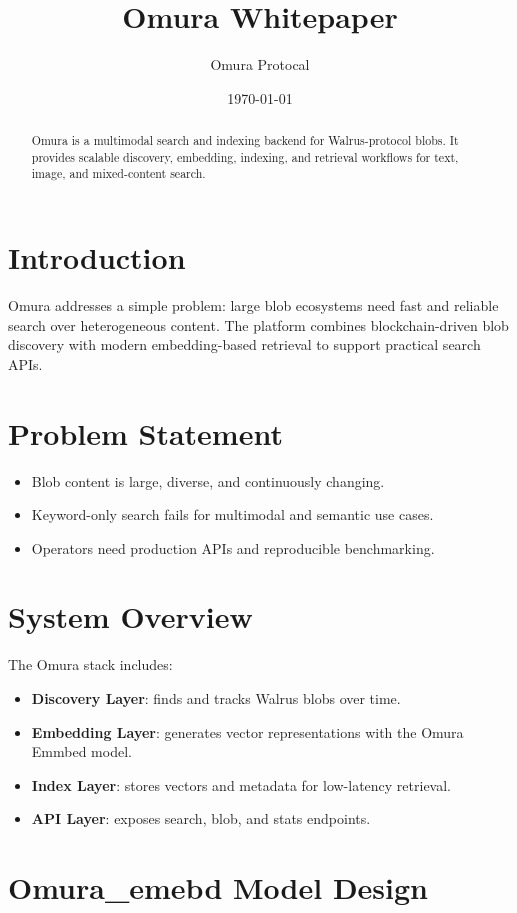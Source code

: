 \documentclass[11pt]{article}
\title{Omura Whitepaper}
\author{Omura Protocal}
\date{\today}
\begin{document}
\maketitle

\begin{abstract}
Omura is a multimodal search and indexing backend for Walrus-protocol blobs.
It provides scalable discovery, embedding, indexing, and retrieval workflows
for text, image, and mixed-content search.
\end{abstract}

\section{Introduction}
Omura addresses a simple problem: large blob ecosystems need fast and reliable
search over heterogeneous content. The platform combines blockchain-driven blob
discovery with modern embedding-based retrieval to support practical search APIs.

\section{Problem Statement}
\begin{itemize}[leftmargin=1.2em]
  \item Blob content is large, diverse, and continuously changing.
  \item Keyword-only search fails for multimodal and semantic use cases.
  \item Operators need production APIs and reproducible benchmarking.
\end{itemize}

\section{System Overview}
The Omura stack includes:
\begin{itemize}[leftmargin=1.2em]
  \item \textbf{Discovery Layer}: finds and tracks Walrus blobs over time.
  \item \textbf{Embedding Layer}: generates vector representations with the Omura Emmbed model.
  \item \textbf{Index Layer}: stores vectors and metadata for low-latency retrieval.
  \item \textbf{API Layer}: exposes search, blob, and stats endpoints.
\end{itemize}

\section{Omura\_emebd Model Design}
\end{document}
